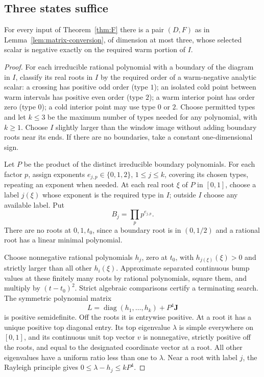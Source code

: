 \subsection{Three states suffice}\label{sec:three-upper}

\begin{lemma}\label{lem:three-upper}
For every input of Theorem~\ref{thm:F} there is a pair \((D,F)\) as in Lemma~\ref{lem:matrix-conversion}, of dimension at most three, whose selected scalar is negative exactly on the required warm portion of \(I\).
\end{lemma}

\begin{proof}
For each irreducible rational polynomial with a boundary of the diagram in \(I\), classify its real roots in \(I\) by the required order of a warm-negative analytic scalar: a crossing has positive odd order (type \(1\)); an isolated cold point between warm intervals has positive even order (type \(2\)); a warm interior point has order zero (type \(0\)); a cold interior point may use type \(0\) or \(2\). Choose permitted types and let \(k\le3\) be the maximum number of types needed for any polynomial, with \(k\ge1\). Choose \(I\) slightly larger than the window image without adding boundary roots near its ends. If there are no boundaries, take a constant one-dimensional sign.

Let \(P\) be the product of the distinct irreducible boundary polynomials. For each factor \(p\), assign exponents \(e_{j,p}\in\{0,1,2\}\), \(1\le j\le k\), covering its chosen types, repeating an exponent when needed. At each real root \(\xi\) of \(P\) in \([0,1]\), choose a label \(j(\xi)\) whose exponent is the required type in \(I\); outside \(I\) choose any available label. Put
\[
B_j=\prod_p p^{e_{j,p}}.
\]
There are no roots at \(0,1,t_0\), since a boundary root is in \((0,1/2)\) and a rational root has a linear minimal polynomial.

Choose nonnegative rational polynomials \(h_j\), zero at \(t_0\), with \(h_{j(\xi)}(\xi)>0\) and strictly larger than all other \(h_i(\xi)\). Approximate separated continuous bump values at these finitely many roots by rational polynomials, square them, and multiply by \((t-t_0)^2\). Strict algebraic comparisons certify a terminating search. The symmetric polynomial matrix
\[
L=\operatorname{diag}(h_1,\ldots,h_k)+P^4\mathbf J
\]
is positive semidefinite. Off the roots it is entrywise positive. At a root it has a unique positive top diagonal entry. Its top eigenvalue \(\lambda\) is simple everywhere on \([0,1]\), and its continuous unit top vector \(v\) is nonnegative, strictly positive off the roots, and equal to the designated coordinate vector at a root. All other eigenvalues have a uniform ratio less than one to \(\lambda\). Near a root with label \(j\), the Rayleigh principle gives \(0\le\lambda-h_j\le kP^4\).


\end{proof}
